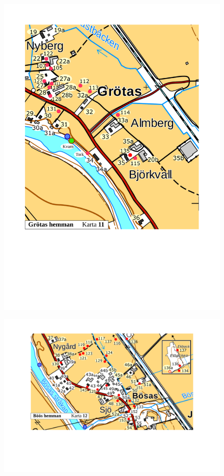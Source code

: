 \begin{figure}[htbp]
  \centering
  \includegraphics[width=1\textwidth]{kartor/Karta11.pdf}
  \label{map:11}
\end{figure}

\begin{figure}[htbp]
  \centering
  \includegraphics[width=1\textwidth]{kartor/Karta12.pdf}
  \label{map:12}
\end{figure}


